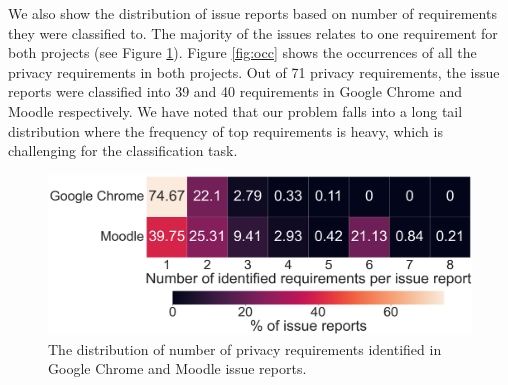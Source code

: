 We also show the distribution of issue reports based on number of requirements they were classified to. The majority of the issues relates to one requirement for both projects (see Figure \ref{fig:req-per-issue}). Figure \ref{fig:occ} shows the occurrences of all the privacy requirements in both projects. Out of 71 privacy requirements, the issue reports were classified into 39 and 40 requirements in Google Chrome and Moodle respectively. We have noted that our problem falls into a long tail distribution where the frequency of top requirements is heavy, which is challenging for the classification task. 

\begin{figure}[ht]
	\centering
	\includegraphics[width=0.9\linewidth]{"Figures/req_per_issue"}
	\caption{The distribution of number of privacy requirements identified in Google Chrome and Moodle issue reports.}
	\label{fig:req-per-issue}
\end{figure}


